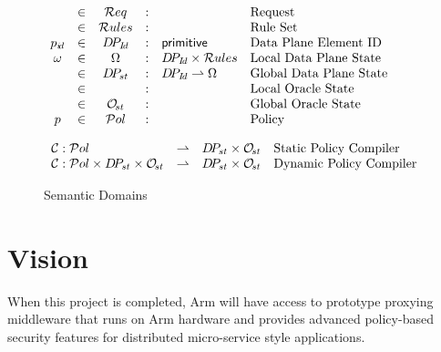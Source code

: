 \documentclass[a4paper]{article}
\begin{document}
\begin{figure}[t]
  \centering
  \(
  \begin{array}[t]{c c c c l l}
                 & \in & \Request     & : &                                & \text{Request}                 \\
                 & \in & \RuleSet     & : &                                & \text{Rule Set}                \\
    \adpid       & \in & \DPId        & : & \text{\sf primitive}           & \text{Data Plane Element ID}   \\
    \adpState    & \in & \dpState     & : & \DPId \times \RuleSet          & 
                                                             \text{Local Data Plane State}                  \\
                 & \in & \gdpState    & : & \DPId \rightharpoonup \dpState & \text{Global Data Plane State} \\
                 & \in &              & : &                                & \text{Local Oracle State}      \\
                 & \in & \oracleState & : &                                & \text{Global Oracle State}     \\
           \apol & \in & \policies    & : &                                & \text{Policy}
  \end{array}
  \)

  \bigskip

  \(
  \begin{array}{l r  c l}
    \compiler : \policies                                      & \rightharpoonup & \gdpState \times \oracleState & \text{Static Policy Compiler} \\
    \compiler : \policies \times \gdpState \times \oracleState & \rightharpoonup & \gdpState \times \oracleState & \text{Dynamic Policy Compiler}            \end{array}
  \)
    \caption{Semantic Domains}
  \label{fig:sem-dom}
\end{figure}

\section{Vision}

When this project is completed, Arm will have access to prototype
proxying middleware that runs on Arm hardware and provides advanced
policy-based security features for distributed micro-service style
applications.








\end{document}
